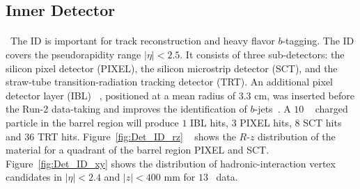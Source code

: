 \subsection{Inner Detector}
\paragraph{}\
The ID is important for track reconstruction and heavy flavor $b$-tagging. 
The ID covers the pseudorapidity range $|\eta| < 2.5$.
It consists of three sub-detectors: the silicon pixel detector (PIXEL), the silicon microstrip detector (SCT), and the straw-tube transition-radiation tracking detector (TRT). 
An additional pixel detector layer (IBL) ~\cite{Capeans:1291633}, positioned at a mean radius of $3.3$ cm, was inserted before the Run-2 data-taking and improves the identification of $b$-jets~\cite{ATL-PHYS-PUB-2015-022}. 
A $10$ \GeV~ charged particle in the barrel region will produce $1$ IBL hits, $3$ PIXEL hits, $8$ SCT hits and $36$ TRT hits.
Figure~\ref{fig:Det_ID_rz} ~\cite{Aaboud:2017pjd} shows the $R$-$z$ distribution of the material for a quadrant of the barrel region PIXEL and SCT. 
Figure~\ref{fig:Det_ID_xy} shows the distribution of hadronic-interaction vertex candidates in $|\eta|<2.4$ and $|z|<400$ mm for $13$\TeV~ data.


